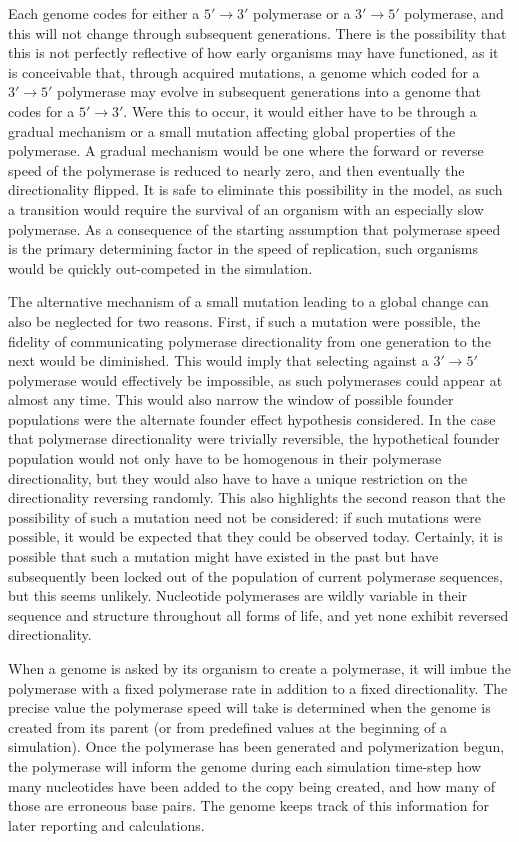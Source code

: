 Each genome codes for either a $5'\to3'$ polymerase or a $3'\to5'$ polymerase, and this will not change through subsequent generations. There is the possibility that this is not perfectly reflective of how early organisms may have functioned, as it is conceivable that, through acquired mutations, a genome which coded for a $3'\to5'$ polymerase may evolve in subsequent generations into a genome that codes for a $5'\to3'$. Were this to occur, it would either have to be through a gradual mechanism or a small mutation affecting global properties of the polymerase. A gradual mechanism would be one where the forward or reverse speed of the polymerase is reduced to nearly zero, and then eventually the directionality flipped. It is safe to eliminate this possibility in the model, as such a transition would require the survival of an organism with an especially slow polymerase. As a consequence of the starting assumption that polymerase speed is the primary determining factor in the speed of replication, such organisms would be quickly out-competed in the simulation.

The alternative mechanism of a small mutation leading to a global change can also be neglected for two reasons. First, if such a mutation were possible, the fidelity of communicating polymerase directionality from one generation to the next would be diminished. This would imply that selecting against a $3'\to5'$ polymerase would effectively be impossible, as such polymerases could appear at almost any time. This would also narrow the window of possible founder populations were the alternate founder effect hypothesis considered. In the case that polymerase directionality were trivially reversible, the hypothetical founder population would not only have to be homogenous in their polymerase directionality, but they would also have to have a unique restriction on the directionality reversing randomly. This also highlights the second reason that the possibility of such a mutation need not be considered: if such mutations were possible, it would be expected that they could be observed today. Certainly, it is possible that such a mutation might have existed in the past but have subsequently been locked out of the population of current polymerase sequences, but this seems unlikely. Nucleotide polymerases are wildly variable in their sequence and structure throughout all forms of life, and yet none exhibit reversed directionality.

When a genome is asked by its organism to create a polymerase, it will imbue the polymerase with a fixed polymerase rate in addition to a fixed directionality. The precise value the polymerase speed will take is determined when the genome is created from its parent (or from predefined values at the beginning of a simulation). Once the polymerase has been generated and polymerization begun, the polymerase will inform the genome during each simulation time-step how many nucleotides have been added to the copy being created, and how many of those are erroneous base pairs. The genome keeps track of this information for later reporting and calculations.

